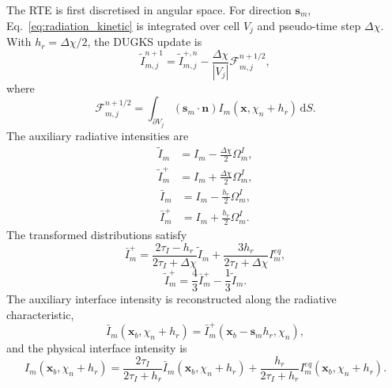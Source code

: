 \documentclass[a4paper,12pt]{ctexart}
\numberwithin{equation}{section}
\newcommand{\vb}[1]{\bm{#1}}
\newcommand{\vx}{\vb{x}}
\newcommand{\vn}{\vb{n}}
\newcommand{\vs}{\vb{s}}
\newcommand{\dd}{\mathrm{d}}
\begin{document}
The RTE is first discretised in angular space. For direction $\vs_m$, Eq.~\eqref{eq:radiation_kinetic} is integrated over cell $V_j$ and pseudo-time step $\Delta\chi$. With $h_r=\Delta\chi/2$, the DUGKS update is
\begin{equation}
\tilde I_{m,j}^{n+1}=\tilde I_{m,j}^{+,n}-\frac{\Delta\chi}{|V_j|}\mathcal{F}_{m,j}^{n+1/2},
\label{eq:I_update}
\end{equation}
where
\begin{equation*}
\mathcal{F}_{m,j}^{n+1/2}=\int_{\partial V_j}(\vs_m\cdot\vn)I_m(\vx,\chi_n+h_r)\,\dd S.
\end{equation*}
The auxiliary radiative intensities are
\begin{equation}
\begin{aligned}
\tilde I_m&=I_m-\frac{\Delta\chi}{2}\Omega_m^I,
\\
\tilde I_m^+&=I_m+\frac{\Delta\chi}{2}\Omega_m^I,
\end{aligned}
\label{eq:I_tilde}
\end{equation}
\begin{equation*}
\begin{aligned}
\bar I_m&=I_m-\frac{h_r}{2}\Omega_m^I,
\\
\bar I_m^+&=I_m+\frac{h_r}{2}\Omega_m^I.
\end{aligned}
\end{equation*}
The transformed distributions satisfy
\begin{equation*}
\bar I_m^+=\frac{2\tau_I-h_r}{2\tau_I+\Delta\chi}\tilde I_m
+\frac{3h_r}{2\tau_I+\Delta\chi}I_m^{eq},
\end{equation*}
\begin{equation*}
\tilde I_m^+=\frac{4}{3}\bar I_m^+-\frac{1}{3}\tilde I_m.
\end{equation*}
The auxiliary interface intensity is reconstructed along the radiative characteristic,
\begin{equation}
\bar I_m(\vx_b,\chi_n+h_r)=\bar I_m^+(\vx_b-\vs_m h_r,\chi_n),
\label{eq:I_characteristic}
\end{equation}
and the physical interface intensity is
\begin{equation}
I_m(\vx_b,\chi_n+h_r)=\frac{2\tau_I}{2\tau_I+h_r}\bar I_m(\vx_b,\chi_n+h_r)
+\frac{h_r}{2\tau_I+h_r}I_m^{eq}(\vx_b,\chi_n+h_r).
\label{eq:I_interface}
\end{equation}
\end{document}
